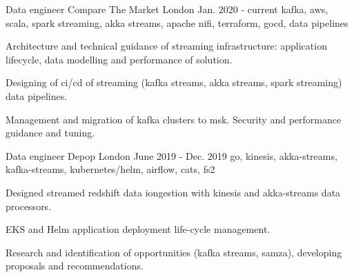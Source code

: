 
\newcommand*{\logo}[2]{\raisebox{-0.2em}{\texttt{[image: \#2]}}\hspace{0.25em}#1}

\begin{cventries}

  \cventry
    {Data engineer} %
    {\logo{\ctm Compare The Market}{../../../images/ctm.png}} %
    {London} %
    {Jan. 2020 - current} %
    {kafka, aws, scala, spark streaming, akka streams, apache nifi, terraform, gocd, data pipelines} %
    {
      \begin{cvitems} %
        \item {Architecture and technical guidance of streaming infrastructure: application lifecycle, data modelling and performance of solution.}
        \item {Designing of ci/cd of streaming (kafka streams, akka streams, spark streaming) data pipelines.}
        \item {Management and migration of kafka clusters to msk. Security and performance guidance and tuning. }
      \end{cvitems}
    }

  \cventry
    {Data engineer} %
    {\logo{\depop Depop}{../../../images/depop.jpg}} %
    {London} %
    {June 2019 - Dec. 2019} %
    {go, kinesis, akka-streams, kafka-streams, kubernetes/helm, airflow, cats, fs2} %
    {
      \begin{cvitems} %
        \item {Designed streamed redshift data iongestion with kinesis and akka-streams data processors.}
        \item {EKS and Helm application deployment life-cycle management.}
        \item {Research and identification of opportunities (kafka streams, samza), developing proposals and recommendations.}
      \end{cvitems}
    }


\end{cventries}

